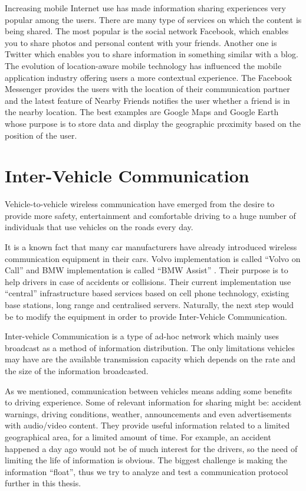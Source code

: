Increasing mobile Internet use has made information sharing experiences very
popular among the users. There are many type of services on which the content is
being shared. The most popular is the social network Facebook, which enables you
to share photos and personal content with your friends. Another one is Twitter
which enables you to share information in something similar with a blog.
The evolution of location-aware mobile technology has influenced the mobile
application industry offering users a more contextual experience. The Facebook
Messenger provides the users with the location of their communication partner
and the latest feature of Nearby Friends notifies the user whether a friend is
in the nearby location. The best examples are Google Maps and Google Earth whose
purpose is to store data and display the geographic proximity based on the
position of the user.

\section{Inter-Vehicle Communication}

Vehicle-to-vehicle wireless communication have emerged from the desire to
provide more safety, entertainment and comfortable driving to a huge number of
individuals that use vehicles on the roads every day.

It is a known fact that many car manufacturers have already introduced wireless
communication equipment in their cars. Volvo implementation is called ``Volvo on
Call'' \citep{volvo} and BMW implementation is called ``BMW Assist''
\cite{bmw_assist}. Their purpose is to help drivers in case of accidents or
collisions. Their current implementation use ``central'' infrastructure based
services based on cell phone technology, existing base stations, long range and
centralised servers. Naturally, the next step would be to modify the equipment
in order to provide Inter-Vehicle Communication.

Inter-vehicle Communication is a type of ad-hoc network which mainly uses
broadcast as a method of information distribution. The only limitations vehicles
may have are the available transmission capacity which depends on the rate and
the size of the information broadcasted.

As we mentioned, communication between vehicles means adding some benefits to
driving experience. Some of relevant information for sharing might be: accident
warnings, driving conditions, weather, announcements and even advertisements
with audio/video content. They provide useful information related to a limited
geographical area, for a limited amount of time. For example, an accident
happened a day ago would not be of much interest for the drivers, so the need of
limiting the life of information is obvious. The biggest challenge is making
the information ``float'', thus we try to analyze and test a communication
protocol further in this thesis.

